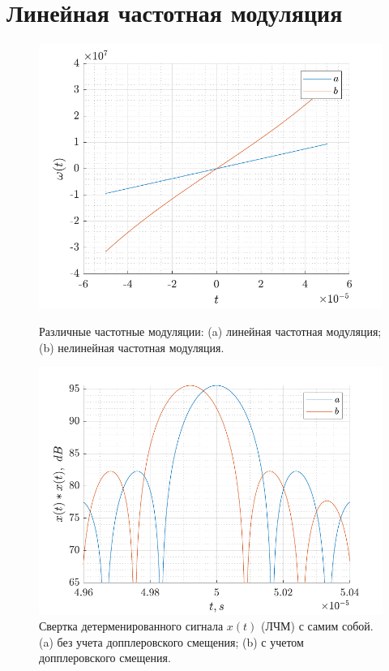 \documentclass[a4paper,14pt]{extarticle}
\begin{document}
\section{Линейная частотная модуляция}%
\label{sec:lineinaia_chastotnaia_moduliatsiia}
\begin{figure}[h!]
    \centering
    \includegraphics[scale=1]{fig/omega}
    \label{fig:omega}
    \caption{Различные частотные модуляции: (a) линейная частотная модуляция;
    (b) нелинейная частотная модуляция.}
\end{figure}

\begin{figure}[h!]
    \centering
    \includegraphics[scale=1]{fig/linear_conv}
    \caption{Свертка детерменированного сигнала $x(t)$ (ЛЧМ) с самим собой.
    (a) без учета допплеровского смещения;
    (b) с учетом допплеровского смещения.}
    \label{fig:linear_conv}
\end{figure}
\end{document}
